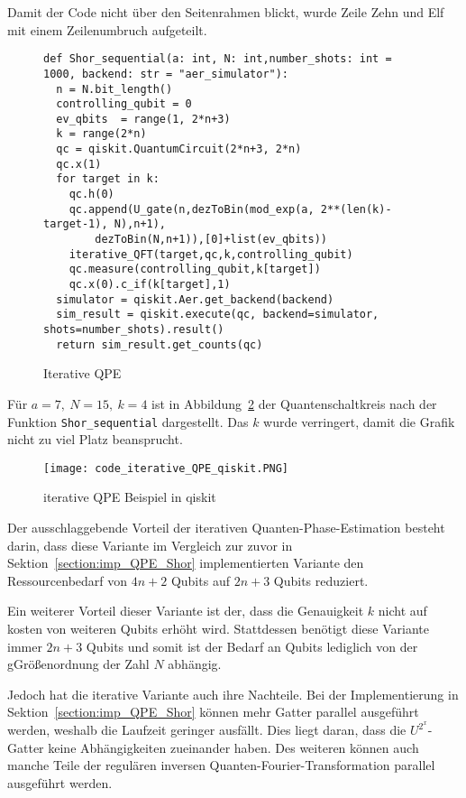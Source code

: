 Damit der Code nicht über den Seitenrahmen blickt, 
wurde Zeile Zehn und Elf mit einem Zeilenumbruch aufgeteilt.

\begin{figure}[H]
  \caption{Iterative QPE}
  \label{code:IterativeQPE}
\begin{verbatim}    
def Shor_sequential(a: int, N: int,number_shots: int = 1000, backend: str = "aer_simulator"):
  n = N.bit_length()
  controlling_qubit = 0
  ev_qbits  = range(1, 2*n+3)
  k = range(2*n)
  qc = qiskit.QuantumCircuit(2*n+3, 2*n) 
  qc.x(1)
  for target in k:
    qc.h(0)
    qc.append(U_gate(n,dezToBin(mod_exp(a, 2**(len(k)-target-1), N),n+1),
        dezToBin(N,n+1)),[0]+list(ev_qbits))
    iterative_QFT(target,qc,k,controlling_qubit)
    qc.measure(controlling_qubit,k[target])
    qc.x(0).c_if(k[target],1)
  simulator = qiskit.Aer.get_backend(backend)
  sim_result = qiskit.execute(qc, backend=simulator, shots=number_shots).result()
  return sim_result.get_counts(qc)
  \end{verbatim}
\end{figure}

Für \(a = 7,~N=15,~k=4\) ist in Abbildung~\ref{fig:iterative_iQPE_qiskit} der Quantenschaltkreis nach der Funktion \texttt{Shor\_sequential} dargestellt.
Das \(k\) wurde verringert, damit die Grafik nicht zu viel Platz beansprucht.

\begin{figure} [H]
  \caption{iterative QPE Beispiel in qiskit}
  \label{fig:iterative_iQPE_qiskit}
  \texttt{[image: code\_iterative\_QPE\_qiskit.PNG]}
  \centering
  \end{figure}

Der ausschlaggebende Vorteil der iterativen Quanten-Phase-Estimation besteht darin, 
dass diese Variante im Vergleich zur zuvor in Sektion~\ref{section:imp_QPE_Shor} implementierten Variante den Ressourcenbedarf von \(4n+2\) Qubits auf \(2n+3\) Qubits reduziert.

Ein weiterer Vorteil dieser Variante ist der, 
dass die Genauigkeit \(k\) nicht auf kosten von weiteren Qubits erhöht wird.
Stattdessen benötigt diese Variante immer \(2n+3\) Qubits und 
somit ist der Bedarf an Qubits lediglich von der gGrößenordnung der Zahl \(N\) abhängig.

Jedoch hat die iterative Variante auch ihre Nachteile.
Bei der Implementierung in Sektion~\ref{section:imp_QPE_Shor} können mehr Gatter parallel ausgeführt werden, 
weshalb die Laufzeit geringer ausfällt.
Dies liegt daran, dass die \(U^{2^x}\)-Gatter keine Abhängigkeiten zueinander haben. 
Des weiteren können auch manche Teile der regulären inversen Quanten-Fourier-Transformation parallel ausgeführt werden.

